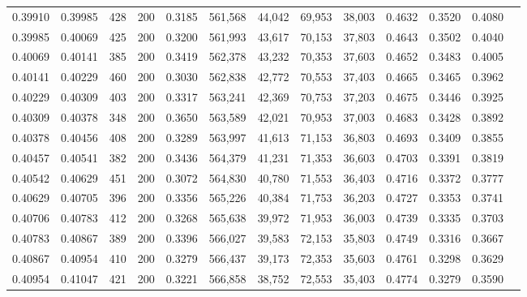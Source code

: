 \begin{tabular}{rrrrrrrrrrrrr}
0.39910 & 0.39985 &    428 & 200 &                                     0.3185 & 561,568 &  44,042 &  69,953 &  38,003 & 0.4632 & 0.3520 & 0.4080 \\
0.39985 & 0.40069 &    425 & 200 &                                     0.3200 & 561,993 &  43,617 &  70,153 &  37,803 & 0.4643 & 0.3502 & 0.4040 \\
0.40069 & 0.40141 &    385 & 200 &                                     0.3419 & 562,378 &  43,232 &  70,353 &  37,603 & 0.4652 & 0.3483 & 0.4005 \\
0.40141 & 0.40229 &    460 & 200 &                                     0.3030 & 562,838 &  42,772 &  70,553 &  37,403 & 0.4665 & 0.3465 & 0.3962 \\
0.40229 & 0.40309 &    403 & 200 &                                     0.3317 & 563,241 &  42,369 &  70,753 &  37,203 & 0.4675 & 0.3446 & 0.3925 \\
0.40309 & 0.40378 &    348 & 200 &                                     0.3650 & 563,589 &  42,021 &  70,953 &  37,003 & 0.4683 & 0.3428 & 0.3892 \\
0.40378 & 0.40456 &    408 & 200 &                                     0.3289 & 563,997 &  41,613 &  71,153 &  36,803 & 0.4693 & 0.3409 & 0.3855 \\
0.40457 & 0.40541 &    382 & 200 &                                     0.3436 & 564,379 &  41,231 &  71,353 &  36,603 & 0.4703 & 0.3391 & 0.3819 \\
0.40542 & 0.40629 &    451 & 200 &                                     0.3072 & 564,830 &  40,780 &  71,553 &  36,403 & 0.4716 & 0.3372 & 0.3777 \\
0.40629 & 0.40705 &    396 & 200 &                                     0.3356 & 565,226 &  40,384 &  71,753 &  36,203 & 0.4727 & 0.3353 & 0.3741 \\
0.40706 & 0.40783 &    412 & 200 &                                     0.3268 & 565,638 &  39,972 &  71,953 &  36,003 & 0.4739 & 0.3335 & 0.3703 \\
0.40783 & 0.40867 &    389 & 200 &                                     0.3396 & 566,027 &  39,583 &  72,153 &  35,803 & 0.4749 & 0.3316 & 0.3667 \\
0.40867 & 0.40954 &    410 & 200 &                                     0.3279 & 566,437 &  39,173 &  72,353 &  35,603 & 0.4761 & 0.3298 & 0.3629 \\
0.40954 & 0.41047 &    421 & 200 &                                     0.3221 & 566,858 &  38,752 &  72,553 &  35,403 & 0.4774 & 0.3279 & 0.3590 \\

\end{tabular}
